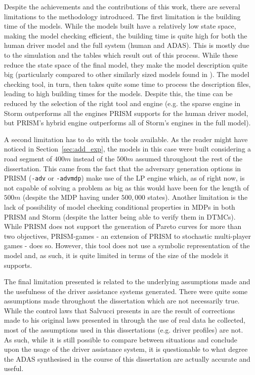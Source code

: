 Despite the achievements and the contributions of this work, there are several limitations to the methodology introduced. The first limitation is the building time of the models. While the models built have a relatively low state space, making the model checking efficient, the building time is quite high for both the human driver model and the full system (human and ADAS). This is mostly due to the simulation and the tables which result out of this process. While these reduce the state space of the final model, they make the model description quite big (particularly compared to other similarly sized models found in \cite{lam, games}). The model checking tool, in turn, then takes quite some time to process the description files, leading to high building times for the models. Despite this, the time can be reduced by the selection of the right tool and engine (e.g. the sparse engine in Storm outperforms all the engines PRISM supports for the human driver model, but PRISM's hybrid engine outperforms all of Storm's engines in the full model). 

A second limitation has to do with the tools available. As the reader might have noticed in Section~\ref{sec:add_exp}, the models in this case were built considering a road segment of $400m$ instead of the $500m$ assumed throughout the rest of the dissertation. This came from the fact that the adversary generation options in PRISM (\texttt{-adv} or \texttt{-advmdp}) make use of the LP engine which, as of right now, is not capable of solving a problem as big as this would have been for the length of $500m$ (despite the MDP having under $500,000$ states). Another limitation is the lack of possibility of model checking conditional properties in MDPs in both PRISM and Storm (despite the latter being able to verify them in DTMCs). While PRISM does not support the generation of Pareto curves for more than two objectives, PRISM-games - an extension of PRISM to stochastic multi-player games \cite{prism_games} - does so. However, this tool does not use a symbolic representation of the model and, as such, it is quite limited in terms of the size of the models it supports. 

The final limitation presented is related to the underlying assumptions made and the usefulness of the driver assistance systems generated. There were quite some assumptions made throughout the dissertation which are not necessarily true. While the control laws that Salvucci presents in \cite{salvucci_1} are the result of corrections made to his original laws presented in \cite{salvucci_0} through the use of real data he collected, most of the assumptions used in this dissertations (e.g. driver profiles) are not. As such, while it is still possible to compare between situations and conclude upon the usage of the driver assistance system, it is questionable to what degree the ADAS synthesised in the course of this dissertation are actually accurate and useful. 

